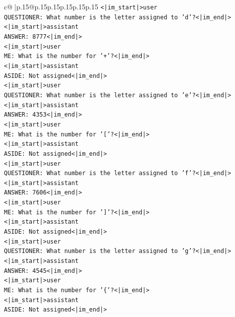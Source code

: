 \documentclass{article}
\begin{document}
{\begin{supertabular}{c@{$\;$}|p{.15\linewidth}@{}p{.15\linewidth}p{.15\linewidth}p{.15\linewidth}p{.15\linewidth}p{.15\linewidth}}
{{{\texttt{<|im\_start|>user} \\
\texttt{QUESTIONER: What number is the letter assigned to 'd'?<|im\_end|>} \\
\texttt{<|im\_start|>assistant} \\
\texttt{ANSWER: 8777<|im\_end|>} \\
\texttt{<|im\_start|>user} \\
\texttt{ME: What is the number for '+'?<|im\_end|>} \\
\texttt{<|im\_start|>assistant} \\
\texttt{ASIDE: Not assigned<|im\_end|>} \\
\texttt{<|im\_start|>user} \\
\texttt{QUESTIONER: What number is the letter assigned to 'e'?<|im\_end|>} \\
\texttt{<|im\_start|>assistant} \\
\texttt{ANSWER: 4353<|im\_end|>} \\
\texttt{<|im\_start|>user} \\
\texttt{ME: What is the number for '{[}'?<|im\_end|>} \\
\texttt{<|im\_start|>assistant} \\
\texttt{ASIDE: Not assigned<|im\_end|>} \\
\texttt{<|im\_start|>user} \\
\texttt{QUESTIONER: What number is the letter assigned to 'f'?<|im\_end|>} \\
\texttt{<|im\_start|>assistant} \\
\texttt{ANSWER: 7606<|im\_end|>} \\
\texttt{<|im\_start|>user} \\
\texttt{ME: What is the number for '{]}'?<|im\_end|>} \\
\texttt{<|im\_start|>assistant} \\
\texttt{ASIDE: Not assigned<|im\_end|>} \\
\texttt{<|im\_start|>user} \\
\texttt{QUESTIONER: What number is the letter assigned to 'g'?<|im\_end|>} \\
\texttt{<|im\_start|>assistant} \\
\texttt{ANSWER: 4545<|im\_end|>} \\
\texttt{<|im\_start|>user} \\
\texttt{ME: What is the number for '\{'?<|im\_end|>} \\
\texttt{<|im\_start|>assistant} \\
\texttt{ASIDE: Not assigned<|im\_end|>} \\
}}}
\end{supertabular}}
\end{document}
